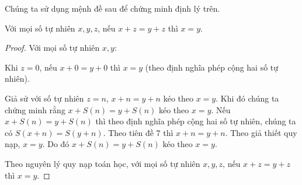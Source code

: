 \noindent Chúng ta sử dụng mệnh đề sau để chứng minh định lý trên.

\begin{proposition}\label{proposition:addition-cancellation}
	Với mọi số tự nhiên $x, y, z$, nếu $x + z = y + z$ thì $x = y$.
\end{proposition}

\begin{proof}
	Với mọi số tự nhiên $x, y$:

	Khi $z = 0$, nếu $x + 0 = y + 0$ thì $x = y$ (theo định nghĩa phép cộng hai số tự nhiên).

	Giả sử với số tự nhiên $z = n$, $x + n = y + n$ kéo theo $x = y$. Khi đó chúng ta chứng minh rằng $x + S(n) = y + S(n)$ kéo theo $x = y$. Nếu $x + S(n) = y + S(n)$ thì theo định nghĩa phép cộng hai số tự nhiên, chúng ta có $S(x + n) = S(y + n)$. Theo tiên đề 7 thì $x + n = y + n$. Theo giả thiết quy nạp, $x = y$. Do đó $x + S(n) = y + S(n)$ kéo theo $x = y$.

	Theo nguyên lý quy nạp toán học, với mọi số tự nhiên $x, y, z$, nếu $x + z = y + z$ thì $x = y$.
\end{proof}

